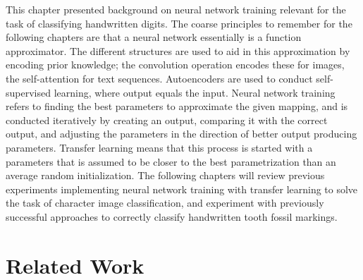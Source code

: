 \documentclass[english,twoside,openright]{UH_DS_MSc}
\begin{document}
\bigskip
\noindent This chapter presented background on neural network training relevant for the task 
of classifying handwritten digits. The coarse principles to remember for the following chapters 
are that a neural network essentially is a function approximator. The different structures are 
used to aid in this approximation by encoding prior knowledge; the convolution operation encodes these 
for images, the self-attention for text sequences. Autoencoders are used to conduct self-supervised
learning, where output equals the input. Neural network training refers to finding the best 
parameters to approximate the given mapping, and is conducted iteratively by creating 
an output, comparing it with the correct output, and adjusting the parameters in the direction 
of better output producing parameters. Transfer learning means that this process is started with a 
 parameters that is assumed to be closer to the best parametrization than an average 
random initialization. The following chapters will review previous experiments implementing 
neural network training with transfer learning to solve the task of character image classification, and experiment with previously successful approaches to correctly classify handwritten tooth fossil markings.

\chapter{Related Work}

\end{document}
